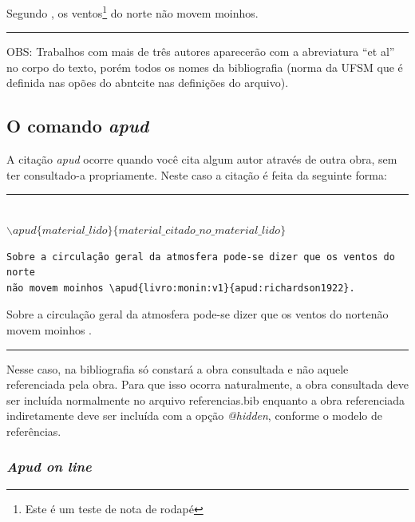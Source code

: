 \documentclass[oneside,openright,12pt]{ufsm_2015} %
\begin{document}
        \par Segundo , os ventos\footnote{Este é um teste de nota de rodapé} do norte não movem moinhos.
        \begin{center}\rule{0.5\textwidth}{1pt}\end{center}   
         \par OBS: Trabalhos com mais de três autores aparecerão com a abreviatura ``et al'' no corpo do texto, porém todos os nomes da bibliografia (norma da UFSM que é definida nas opões do abntcite nas definições do arquivo). 
  
  \subsection{O comando \textit{apud}}
  \par A citação \textit{apud} ocorre quando você cita algum autor através de outra obra, sem ter consultado-a propriamente. Neste caso a citação é feita da seguinte forma:
  \begin{center}
  \rule{0.5\textwidth}{1pt}\\
  $\backslash apud\{material\_lido\}\{material\_citado\_no\_material\_lido\}$ \\
  \end{center}
\begin{verbatim}
Sobre a circulação geral da atmosfera pode-se dizer que os ventos do norte
não movem moinhos \apud{livro:monin:v1}{apud:richardson1922}.
\end{verbatim}
  
  Sobre a circulação geral da atmosfera pode-se dizer que os ventos do nortenão movem moinhos .
\begin{center}\rule{0.5\textwidth}{1pt}\end{center}  
  \par Nesse caso, na bibliografia só constará a obra consultada e não aquele referenciada pela obra. Para que isso ocorra naturalmente, a obra consultada deve ser incluída normalmente no arquivo referencias.bib enquanto a obra referenciada indiretamente deve ser incluída com a opção \textit{@hidden}, conforme o modelo de referências.

      \subsubsection{\textit{Apud on line}}
      
\end{document}
